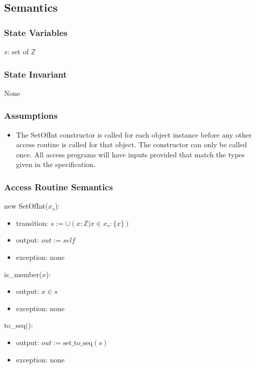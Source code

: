 \documentclass[12pt,fleqn]{examtst}
\begin{document}
\subsection* {Semantics}

\subsubsection* {State Variables}

$s$: set of $\mathbb{Z}$

\subsubsection* {State Invariant}

None

\subsubsection* {Assumptions}

\begin{itemize}
\item The SetOfInt constructor is called for each object instance before any
  other access routine is called for that object.  The constructor can only be
  called once.  All access programs will have inputs provided that match the types
  given in the specification.
\end{itemize}

\subsubsection* {Access Routine Semantics}

\noindent new SetOfInt($x_s$):
\begin{itemize}
\item transition: $s := \cup (x: \mathbb{Z} | x \in x_s : \{ x \} )$
\item output: $\mathit{out} := \mathit{self}$
\item exception: none
\end{itemize}

\noindent is\_member($x$):
\begin{itemize}
\item output: $x \in s$
\item exception: none
\end{itemize}

\noindent to\_seq():
\begin{itemize}
\item output: $out := \mbox{set\_to\_seq}(s)$
\item exception: none
\end{itemize}
\end{document}
